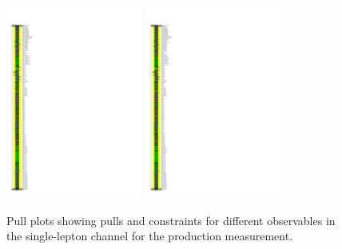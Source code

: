 \begin{figure}[ht]
  \centering
  \includegraphics[width=0.40\textwidth, viewport=0 375 150 750, clip]{figures/diff_xsec/ljet_tty_prod_mu_blinded/compare_NP_pulls/compare_NP_dilep_fits_drphb_drlj_dr/NuisPar_comp.pdf}%
  \includegraphics[width=0.40\textwidth, viewport=0 0 150 375, clip]{figures/diff_xsec/ljet_tty_prod_mu_blinded/compare_NP_pulls/compare_NP_dilep_fits_drphb_drlj_dr/NuisPar_comp.pdf}%
  \caption{Pull plots showing pulls and constraints for different observables in the single-lepton channel for the \tty production measurement.}
  \label{fig:pull_plot_pt_tty_dec_free_ljet_mu_blinded}

\end{figure}


